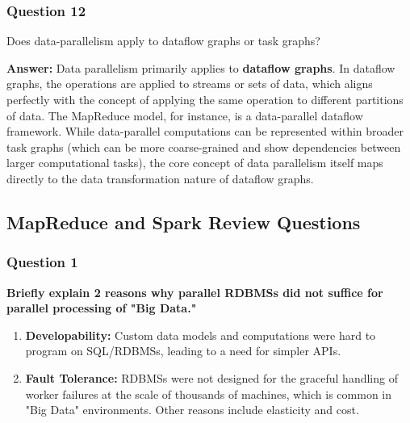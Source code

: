 \documentclass{article}
\begin{document}
\subsubsection*{Question 12}
Does data-parallelism apply to dataflow graphs or task graphs? 

\textbf{Answer:}
Data parallelism primarily applies to \textbf{dataflow graphs}. In dataflow graphs, the operations are applied to streams or sets of data, which aligns perfectly with the concept of applying the same operation to different partitions of data. The MapReduce model, for instance, is a data-parallel dataflow framework. While data-parallel computations can be represented within broader task graphs (which can be more coarse-grained and show dependencies between larger computational tasks), the core concept of data parallelism itself maps directly to the data transformation nature of dataflow graphs.

\subsection*{MapReduce and Spark Review Questions}

\subsubsection*{Question 1}

\textbf{Briefly explain 2 reasons why parallel RDBMSs did not suffice for parallel processing of "Big Data."}
    \begin{enumerate}[label=\alph*)]
        \item \textbf{Developability:} Custom data models and computations were hard to program on SQL/RDBMSs, leading to a need for simpler APIs.
        \item \textbf{Fault Tolerance:} RDBMSs were not designed for the graceful handling of worker failures at the scale of thousands of machines, which is common in "Big Data" environments. Other reasons include elasticity and cost.
    \end{enumerate}
\end{document}
